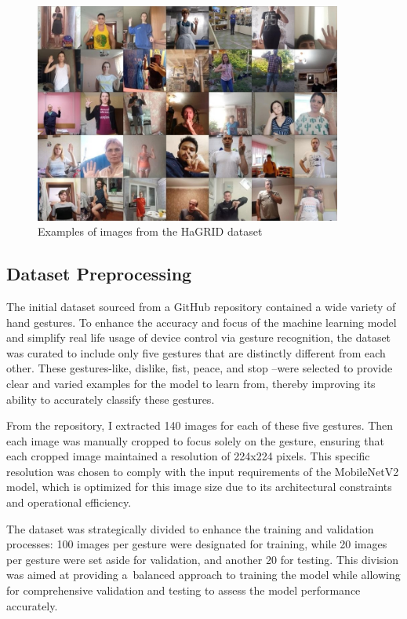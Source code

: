 \begin{figure}[h]
    \centering
    \includegraphics[width=0.9\textwidth]{obrazky-figures/data_set_example.jpg}
    \caption{Examples of images from the HaGRID dataset}
    \label{fig:dataset_examples}
\end{figure}

\newpage
\subsection{Dataset Preprocessing}
The initial dataset sourced from a GitHub repository contained a wide variety of hand gestures. To enhance the accuracy and focus of the machine learning model and simplify real life usage of device control via gesture recognition, the dataset was curated to include only five gestures that are distinctly different from each other. These gestures-like, dislike, fist, peace, and stop --were selected to provide clear and varied examples for the model to learn from, thereby improving its ability to accurately classify these gestures.

From the repository, I extracted 140 images for each of these five gestures. Then each image was manually cropped to focus solely on the gesture, ensuring that each cropped image maintained a resolution of 224x224 pixels. This specific resolution was chosen to comply with the input requirements of the MobileNetV2 model, which is optimized for this image size due to its architectural constraints and operational efficiency.

The dataset was strategically divided to enhance the training and validation processes: 100 images per gesture were designated for training, while 20 images per gesture were set aside for validation, and another 20 for testing. This division was aimed at providing a~balanced approach to training the model while allowing for comprehensive validation and testing to assess the model performance accurately.

